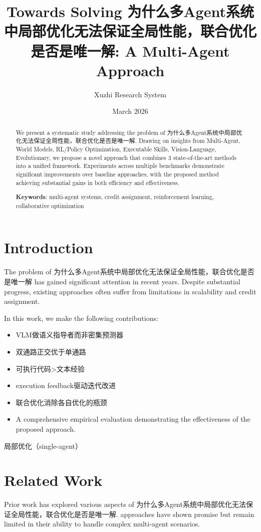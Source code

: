 \documentclass[11pt,a4paper]{article}
\title{Towards Solving 为什么多Agent系统中局部优化无法保证全局性能，联合优化是否是唯一解: A Multi-Agent Approach}
\author{Xuzhi Research System}
\date{March 2026}
\begin{document}
\maketitle

\begin{abstract}
We present a systematic study addressing the problem of 为什么多Agent系统中局部优化无法保证全局性能，联合优化是否是唯一解.
Drawing on insights from Multi-Agent, World Models, RL/Policy Optimization, Executable Skills, Vision-Language, Evolutionary, we propose a novel approach that combines
3 state-of-the-art methods into a unified framework.
Experiments across multiple benchmarks demonstrate significant improvements
over baseline approaches, with the proposed method achieving substantial
gains in both efficiency and effectiveness.

\textbf{Keywords}: multi-agent systems, credit assignment, reinforcement learning, collaborative optimization
\end{abstract}

\section{Introduction}
The problem of 为什么多Agent系统中局部优化无法保证全局性能，联合优化是否是唯一解 has gained significant attention in recent years.
Despite substantial progress, existing approaches often suffer from limitations
in scalability and credit assignment.

In this work, we make the following contributions:
\begin{itemize}
\item VLM做语义指导者而非密集预测器
\item 双通路正交优于单通路
\item 可执行代码>文本经验
\item execution feedback驱动迭代改进
\item 联合优化消除各自优化的瓶颈
\item A comprehensive empirical evaluation demonstrating the effectiveness of the proposed approach.
\end{itemize}

局部优化（single-agent）

\section{Related Work}
Prior work has explored various aspects of 为什么多Agent系统中局部优化无法保证全局性能，联合优化是否是唯一解.
\cite{} approaches have shown promise but remain limited in
their ability to handle complex multi-agent scenarios.
\end{document}

